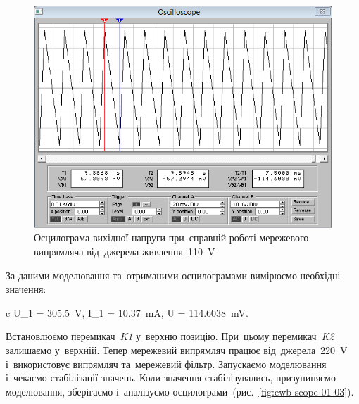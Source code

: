 \documentclass[
	a4paper,
	oneside,
	BCOR = 10mm,
	DIV = 12,
	12pt,
	headings = normal,
]{scrartcl}
\newcommand{\schel}[1]{\textit{#1}}
\begin{document}
			\begin{figure}[!htbp]
				\centering
				\includegraphics[height = 8\baselineskip]{./assets/y03s02-pcdiag-lab-01-p01-02b.png}
				\caption{Осцилограма вихідної напруги при~справній роботі мережевого випрямляча від~джерела живлення~\SI{110}{\volt}}
				\label{fig:ewb-scope-01-02}
			\end{figure}
			
			За даними моделювання та~отриманими осцилограмами вимірюємо необхідні значення:
			\begin{IEEEeqnarray*}{c}
				U_1 = \SI{305.5}{\volt}, \quad 
				I_1 = \SI{10.37}{\milli\ampere}, \quad
				\Delta U = \SI{114.6038}{\milli\volt}. 
			\end{IEEEeqnarray*}

			Встановлюємо перемикач~\schel{K1} у~верхню позицію. При~цьому перемикач~\schel{K2} залишаємо у~верхній. Тепер мережевий випрямляч працює від~джерела~\SI{220}{\volt} і~використовує випрямляч та~мережевий фільтр. Запускаємо моделювання і~чекаємо стабілізації значень. Коли значення стабілізувались, призупиняємо моделювання, зберігаємо і~аналізуємо осцилограми~(рис.~\ref{fig:ewb-scope-01-03}). 
\end{document}
